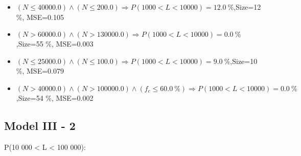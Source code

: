 \documentclass[numbered]{CSL}
\begin{document}
\begin{itemize}
\item $(N \leq 40000.0) \land (N \leq 200.0) \Rightarrow P(1 000 < L < 10 000) = 12.0~\%$,\hfill Size=12 \%, MSE=0.105
\item $(N > 60000.0) \land (N > 130000.0) \Rightarrow P(1 000 < L < 10 000) = 0.0~\%$,\hfill Size=55 \%, MSE=0.003
\item $(N \leq 25000.0) \land (N \leq 100.0) \Rightarrow P(1 000 < L < 10 000) = 9.0~\%$,\hfill Size=10 \%, MSE=0.079
\item $(N > 40000.0) \land (N > 100000.0) \land (f_c \leq 60.0~\%) \Rightarrow P(1 000 < L < 10 000) = 0.0~\%$,\hfill Size=54 \%, MSE=0.002
\end{itemize}

\subsection{Model III - 2}
P(10 000 < L < 100 000):
\end{document}
